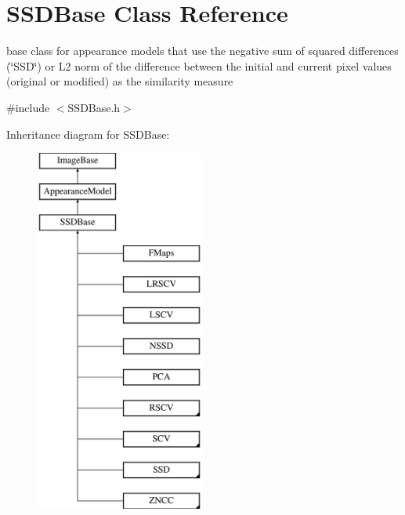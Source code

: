 \hypertarget{classSSDBase}{\section{S\-S\-D\-Base Class Reference}
\label{classSSDBase}
}


base class for appearance models that use the negative sum of squared differences (\char`\"{}\-S\-S\-D\char`\"{}) or L2 norm of the difference between the initial and current pixel values (original or modified) as the similarity measure  




{\ttfamily \#include $<$S\-S\-D\-Base.\-h$>$}

Inheritance diagram for S\-S\-D\-Base\-:\begin{figure}[H]
\begin{center}
\leavevmode
\includegraphics[height=12.000000cm]{classSSDBase}
\end{center}
\end{figure}
